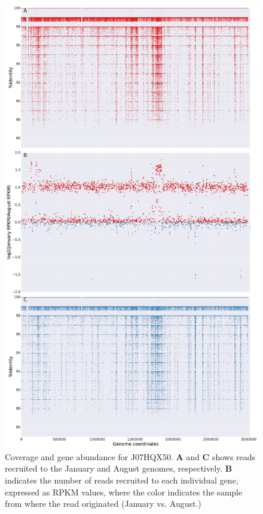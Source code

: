 \begin{figure}[!hbtp]
  \centering
  \includegraphics[width=\textwidth,height=0.8\textheight,keepaspectratio]{Chapter5/Figures/coverage_plots/J07HQX50_coverage.pdf}
  \caption{Coverage and gene abundance for J07HQX50. \textbf{A} and \textbf{C} shows reads recruited to the January and August genomes, respectively. \textbf{B} indicates the number of reads recruited to each individual gene, expressed as RPKM values, where the color indicates the sample from where the read originated (January vs. August.)}
  \label{J07HQXcoverage}
\end{figure}

